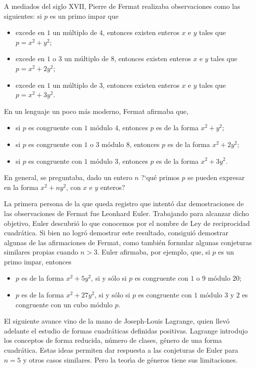 A mediados del siglo XVII, Pierre de Fermat realizaba observaciones como
las siguientes: si $p$ es un primo impar que
\begin{itemize}
	\item excede en $1$ un m\'ultiplo de $4$, entonces existen enteros
		$x$ e $y$ tales que $p=x^2+y^2$;
	\item excede en $1$ o $3$ un m\'ultiplo de $8$, entonces existen
		enteros $x$ e $y$ tales que $p=x^2+2y^2$;
	\item excede en $1$ un m\'ultiplo de $3$, entonces existen enteros
		$x$ e $y$ tales que $p=x^2+3y^2$.
\end{itemize}
%
En un lenguaje un poco m\'as moderno, Fermat afirmaba que,
\begin{itemize}
	\item si $p$ es congruente con $1$ m\'odulo $4$,
		entonces $p$ es de la forma $x^2+y^2$;
	\item si $p$ es congruente con $1$ o $3$ m\'odulo $8$,
		entonces $p$ es de la forma $x^2+2y^2$;
	\item si $p$ es congruente con $1$ m\'odulo $3$,
		entonces $p$ es de la forma $x^2+3y^2$.
\end{itemize}
%
En general, se preguntaba, dado un entero $n$ ?`qu\'e primos $p$ se pueden
expresar en la forma $x^2+ny^2$, con $x$ e $y$ enteros?

La primera persona de la que queda registro que intent\'o dar demostraciones
de las observaciones de Fermat fue Leonhard Euler. Trabajando para alcanzar
dicho objetivo, Euler descubri\'o lo que conocemos por el nombre de Ley de
reciprocidad cuadr\'atica. Si bien no logr\'o demostrar este resultado,
consigui\'o demostrar algunas de las afirmaciones de Fermat, como tambi\'en
formular algunas conjeturas similares propias cuando $n>3$.
Euler afirmaba, por ejemplo, que, si $p$ es un primo impar, entonces
\begin{itemize}
	\item $p$ es de la forma $x^2+5y^2$, si y s\'olo si
		$p$ es congruente con $1$ o $9$ m\'odulo $20$;
	\item $p$ es de la forma $x^2+27y^2$, si y s\'olo si
		$p$ es congruente con $1$ m\'odulo $3$ y $2$ es congruente
		con un cubo m\'odulo $p$.
\end{itemize}
%

El siguiente avance vino de la mano de Joseph-Louis Lagrange, quien llev\'o
adelante el estudio de formas cuadr\'aticas definidas positivas. Lagrange
introdujo los conceptos de forma reducida, n\'umero de clases, g\'enero de
una forma cuadr\'atica. Estas ideas permiten dar respuesta a las conjeturas
de Euler para $n=5$ y otros casos similares. Pero la teor\'{\i}a de g\'eneros
tiene sus limitaciones.

